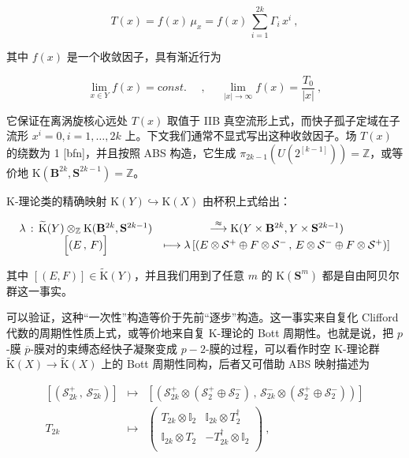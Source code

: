 \documentclass[11pt,a4paper]{ctexart}
\begin{document}
\[T(x)=f(x)\,\mu_x=f(x)\,\sum_{i=1}^{2k}\Gamma_i\,x^i\ ,\]

其中 \(f(x)\) 是一个收敛因子，具有渐近行为

\[\lim_{x\in Y}f(x)={\mathrm const.}~~~~~~,~~~~~~
\lim_{|x|\rightarrow\infty}f(x)=\frac{T_0}{|x|}\ ,\]

它保证在离涡旋核心远处 \(T(x)\) 取值于 IIB 真空流形上式，而快子孤子定域在子流形 \(x^i=0, i=1,\ldots, 2k\) 上。下文我们通常不显式写出这种收敛因子。场 \(T(x)\) 的绕数为 1 [bfn]，并且按照 ABS 构造，它生成 \(\pi_{2k-1}(U(2^[k-1]))= {\mathbb{Z}}\)，或等价地 \({\mathrm K}({\mathbf B}^{2k},{\mathbf S}^{2k-1})={\mathbb{Z}}\)。

K-理论类的精确映射 \({\mathrm K}(Y)\hookrightarrow {\mathrm K}(X)\) 由杯积上式给出：

\[\begin{matrix}
\lambda\,:\,\widetilde{{\mathrm K}}(Y)\otimes_{\mathbb{Z}}
{\mathrm K}({\mathbf B}^{2k},{\mathbf S}^{2k-1})&\stackrel{\approx}{\longrightarrow}
{\mathrm K}(Y\times{\mathbf B}^{2k},Y\times{\mathbf S}^{2k-1})\\
\Bigl[(E\,,\,F)\Bigr]&\longmapsto
\lambda\left[(E\otimes{\mathcal S}^+
\oplus F\otimes{\mathcal S}^-\,,\,E\otimes{\mathcal S}^-\oplus
F\otimes{\mathcal S}^+)\right]
\end{matrix}\]

其中 \([(E,F)]\in\widetilde{{\mathrm K}}(Y)\)，并且我们用到了任意 \(m\) 的 \({\mathrm K}({\mathbf S}^m)\) 都是自由阿贝尔群这一事实。

可以验证，这种``一次性''构造等价于先前``逐步''构造。这一事实来自复化 Clifford 代数的周期性性质上式，或等价地来自复 K-理论的 Bott 周期性。也就是说，把 \(p\)-膜 \(\overline{p}\)-膜对的束缚态经快子凝聚变成 \(p-2\)-膜的过程，可以看作时空 K-理论群 \(\widetilde{{\mathrm K}}(X)\rightarrow \widetilde{{\mathrm K}}(X)\) 上的 Bott 周期性同构，后者又可借助 ABS 映射描述为

\[\begin{matrix}
\left[({\mathcal S}_{2k}^+\,,\,{\mathcal S}_{2k}^-)\right]&\longmapsto&\left[\left({\mathcal S}_{2k}^+\otimes({\mathcal S}_2^+\oplus{\mathcal S}_2^-)\,,\,{\mathcal S}_{2k}^-\otimes({\mathcal S}_2^+\oplus{\mathcal S}_2^-)\right)\right]\\
T_{2k}&\longmapsto&\begin{pmatrix}T_{2k}\otimes {\mathbb{I}}_2&{\mathbb{I}}_{2k}\otimes T_2^\dagger\\ {\mathbb{I}}_{2k}\otimes T_2&-T_{2k}^\dagger\otimes {\mathbb{I}}_2\\\end{pmatrix}\ ,
\end{matrix}\]
\end{document}
